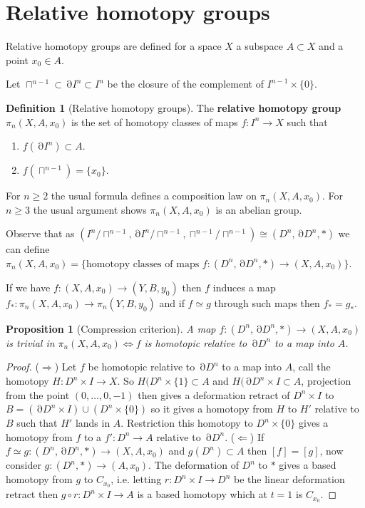 \documentclass[10pt,]{book}
\newcommand{\terminology}[1]{\textbf{#1}}
\theoremstyle{plain}
\newtheorem{proposition}[theorem]{Proposition}
\theoremstyle{definition}
\newtheorem{definition}[theorem]{Definition}
\DeclareMathOperator{\dd}{\partial}
\begin{document}
\section[Relative homotopy groups]{Relative homotopy groups}\label{sec-rel-homotopy}
Relative homotopy groups are defined for a space \(X\) a subspace \(A\subset X\) and a point \(x_0\in A\).%
\par
Let \(\sqcap^{n-1} \subset \dd I^n \subset I^n\) be the closure of the complement of \(I^{n-1}\times\{0\}\).%
\begin{definition}[Relative homotopy groups]\label{definition-2}
The \terminology{relative homotopy group}\(\pi_n(X,A,x_0)\) is the set of homotopy classes of maps \(f\colon I^n\to X\) such that
            \begin{enumerate}
\item{}\(f(\dd I^n)\subset A\).\item{}\(f(\sqcap^{n-1}) = \{x_0\}\).\end{enumerate}

            For \(n\ge 2\) the usual formula defines a composition law on \(\pi_n(X,A,x_0)\).
            For \(n\ge 3\) the usual argument shows \(\pi_n(X,A,x_0)\) is an abelian group.
          \end{definition}
\par
Observe that as \((I^n/\sqcap^{n-1}, \dd I^n/\sqcap^{n-1},\sqcap^{n-1}/\sqcap^{n-1})\cong (D^n,\dd D^n, *)\) we can define \(\pi_n(X,A,x_0) = \{\text{homotopy classes of maps }f\colon (D^n,\dd D^n, *)\to (X,A,x_0)\}\).%
\par
If we have \(f\colon (X,A, x_0) \to (Y,B,y_0)\) then \(f\) induces a map \(f_*\colon \pi_n(X,A,x_0)\to \pi_n(Y,B,y_0)\) and if \(f\simeq g\) through such maps then \(f_* = g_*\).%
\begin{proposition}[Compression criterion]\label{proposition-1}
A map \(f\colon (D^n, \dd D^n, *)\to (X,A, x_0)\) is trivial in \(\pi_n(X,A,x_0)\iff f\) is homotopic relative to \(\dd D^n\) to a map into \(A\).\end{proposition}
\begin{proof}
(\(\Rightarrow\)) Let \(f\) be homotopic relative to \(\dd D^n\) to a map into \(A\), call the homotopy \(H\colon D^n\times I \to X\).
            So \(H(D^n\times \{1\}\subset A\) and \(H(\dd D^n \times I\subset A\), projection from the point \((0,\ldots,0,-1)\) then gives a deformation retract of \(D^n \times I\) to \(B = (\dd D^n \times I)\cup (D^n\times\{0\})\) so it gives a homotopy from \(H\) to \(H'\) relative to \(B\) such that \(H'\) lands in \(A\).
            Restriction this homotopy to \(D^n\times \{0\}\) gives a homotopy from \(f\) to a \(f'\colon D^n \to A\) relative to \(\dd D^n\).
            \newline{}
            (\(\Leftarrow\)) If \(f\simeq g\colon( D^n,\dd D^n, *)\to (X,A,x_0) \) and \(g(D^n)\subset A\) then \([f] = [g]\), now consider \(g\colon (D^n , *) \to (A,x_0)\).
            The deformation of \(D^n\) to \(*\) gives a based homotopy from \(g\) to \(C_{x_0}\), i.e. letting \(r\colon D^n \times I \to D^n\) be the linear deformation retract then \(g\circ r \colon D^n \times I \to A\) is a based homotopy which at \(t = 1\) is \(C_{x_0}\).
\end{proof}
%
\backmatter
%
\end{document}
